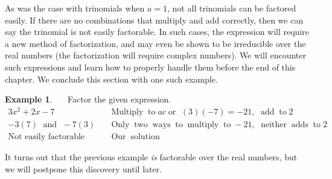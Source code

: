 \documentclass[12pt]{book}
\theoremstyle{definition}
\newtheorem{example}{Example}
\newcommand{\tmop}[1]{\ensuremath{\operatorname{#1}}}
\begin{document}
As was the case with trinomials when $a = 1$, not all trinomials can be factored easily. If there are no combinations that multiply and add correctly, then we can say the trinomial is not easily factorable.  In such cases, the expression will require a new method of factorization, and may even be shown to be irreducible over the real numbers (the factorization will require complex numbers).  We will encounter such expressions and learn how to properly handle them before the end of this chapter.  We conclude this section with one such example.
\begin{example}~~~Factor the given expression.
  \begin{eqnarray*}
    3 x^2 + 2 x - 7 &  & \tmop{Multiply} \tmop{to} a c \tmop{or~} (3) (- 7) = -
    21, \tmop{~add} \tmop{to} 2\\
    - 3 (7) \tmop{~and~} - 7 (3) &  & \tmop{Only} \tmop{two} \tmop{ways}
    \tmop{to} \tmop{multiply} \tmop{to} - 21, \tmop{~neither} \tmop{adds} \tmop{to} 2\\
        \tmop{Not~easily~factorable} &  & \tmop{Our} \tmop{solution}
  \end{eqnarray*}
\end{example}
It turns out that the previous example {\it is} factorable over the real numbers, but we will postpone this discovery until later.
\end{document}
